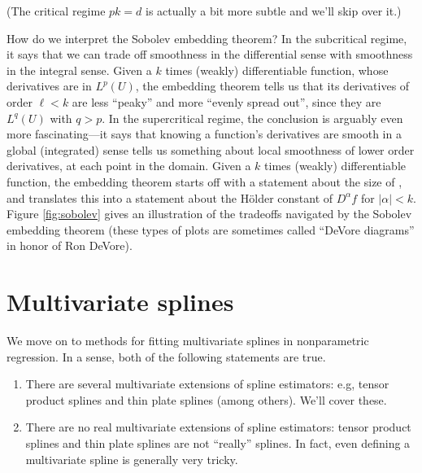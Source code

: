 \documentclass{article}
\begin{document}


\medskip
(The critical regime $pk = d$ is actually a bit more subtle and we'll skip over
it.)  

How do we interpret the Sobolev embedding theorem? In the subcritical regime, it
says that we can trade off smoothness in the differential sense with smoothness
in the integral sense. Given a $k$ times (weakly) differentiable function, whose
derivatives are in $L^p(U)$, the embedding theorem tells us that its derivatives
of order $\ell < k$ are less ``peaky'' and more ``evenly spread out'', since
they are $L^q(U)$ with $q > p$.
In the supercritical regime, the conclusion is arguably even more
fascinating---it says that knowing a function's derivatives are smooth in a
global (integrated) sense tells us something about local smoothness of lower
order derivatives, at each point in the domain. Given a $k$ times (weakly)
differentiable function, the embedding theorem starts off with a statement about
the size of , and
translates this into a statement about the H{\"o}lder constant of $D^\alpha f$
for $|\alpha| < k$.      
Figure \ref{fig:sobolev} gives an illustration of the tradeoffs navigated by the
Sobolev embedding theorem (these types of plots are sometimes called ``DeVore
diagrams'' in honor of Ron DeVore).   

\section{Multivariate splines}

We move on to methods for fitting multivariate splines in nonparametric
regression. In a sense, both of the following statements are true. 

\begin{enumerate}
\item There are several multivariate extensions of spline estimators: e.g,
  tensor product splines and thin plate splines (among others). We'll cover
  these. 
\item There are no real multivariate extensions of spline estimators: tensor
  product splines and thin plate splines are not ``really'' splines. In fact,
  even defining a multivariate spline is generally very tricky. 
\end{enumerate}
\end{document}
